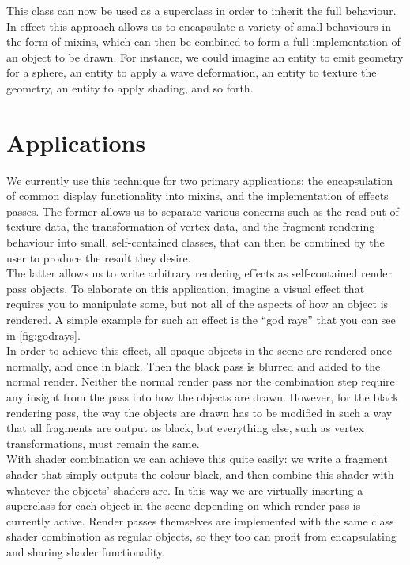 \documentclass[format=sigconf]{acmart}
\begin{document}
This  class can now be used as a superclass in order to inherit the full behaviour. In effect this approach allows us to encapsulate a variety of small behaviours in the form of mixins, which can then be combined to form a full implementation of an object to be drawn. For instance, we could imagine an entity to emit geometry for a sphere, an entity to apply a wave deformation, an entity to texture the geometry, an entity to apply shading, and so forth.

\section{Applications}\label{section:5}
We currently use this technique for two primary applications: the encapsulation of common display functionality into mixins, and the implementation of effects passes. The former allows us to separate various concerns such as the read-out of texture data, the transformation of vertex data, and the fragment rendering behaviour into small, self-contained classes, that can then be combined by the user to produce the result they desire. \\

The latter allows us to write arbitrary rendering effects as self-contained render pass objects. To elaborate on this application, imagine a visual effect that requires you to manipulate some, but not all of the aspects of how an object is rendered. A simple example for such an effect is the ``god rays'' that you can see in \autoref{fig:godrays}. \\

In order to achieve this effect, all opaque objects in the scene are rendered once normally, and once in black. Then the black pass is blurred and added to the normal render. Neither the normal render pass nor the combination step require any insight from the pass into how the objects are drawn. However, for the black rendering pass, the way the objects are drawn has to be modified in such a way that all fragments are output as black, but everything else, such as vertex transformations, must remain the same. \\

With shader combination we can achieve this quite easily: we write a fragment shader that simply outputs the colour black, and then combine this shader with whatever the objects' shaders are. In this way we are virtually inserting a superclass for each object in the scene depending on which render pass is currently active. Render passes themselves are implemented with the same class shader combination as regular objects, so they too can profit from encapsulating and sharing shader functionality.
\end{document}
